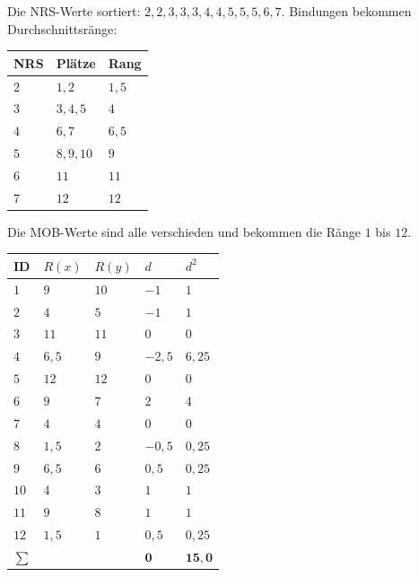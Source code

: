 \begin{merksatz}
Die NRS-Werte sortiert: $2,2,3,3,3,4,4,5,5,5,6,7$. Bindungen bekommen Durchschnittsränge:
\begin{center}
{\small
\renewcommand{\arraystretch}{1.35}
\begin{tabular}{@{}P{1.4cm}P{2.6cm}P{2.4cm}@{}}
\toprule
\textbf{NRS} & \textbf{Plätze} & \textbf{Rang}\\
\midrule
$2$ & $1, 2$ & $1{,}5$\\
$3$ & $3, 4, 5$ & $4$\\
$4$ & $6, 7$ & $6{,}5$\\
$5$ & $8, 9, 10$ & $9$\\
$6$ & $11$ & $11$\\
$7$ & $12$ & $12$\\
\bottomrule
\end{tabular}}
\end{center}
Die MOB-Werte sind alle verschieden und bekommen die Ränge $1$ bis $12$.

\begin{center}
{\small
\renewcommand{\arraystretch}{1.28}
\begin{tabular}{@{}P{0.9cm}P{1.4cm}P{1.4cm}P{1.2cm}P{1.3cm}@{}}
\toprule
\textbf{ID} & $R(x)$ & $R(y)$ & $d$ & $d^2$\\
\midrule
$1$ & $9$ & $10$ & $-1$ & $1$\\
$2$ & $4$ & $5$ & $-1$ & $1$\\
$3$ & $11$ & $11$ & $0$ & $0$\\
$4$ & $6{,}5$ & $9$ & $-2{,}5$ & $6{,}25$\\
$5$ & $12$ & $12$ & $0$ & $0$\\
$6$ & $9$ & $7$ & $2$ & $4$\\
$7$ & $4$ & $4$ & $0$ & $0$\\
$8$ & $1{,}5$ & $2$ & $-0{,}5$ & $0{,}25$\\
$9$ & $6{,}5$ & $6$ & $0{,}5$ & $0{,}25$\\
$10$ & $4$ & $3$ & $1$ & $1$\\
$11$ & $9$ & $8$ & $1$ & $1$\\
$12$ & $1{,}5$ & $1$ & $0{,}5$ & $0{,}25$\\
\midrule
$\sum$ & & & $\mathbf{0}$ & $\mathbf{15{,}0}$\\
\bottomrule
\end{tabular}}
\end{center}


\end{merksatz}

